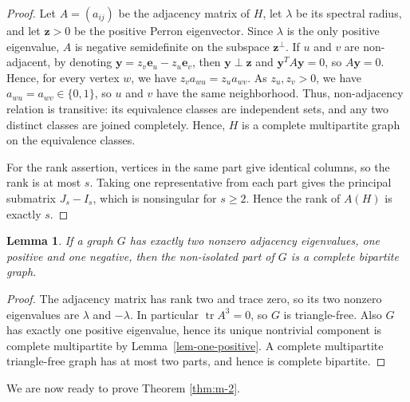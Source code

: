 \documentclass[11pt,a4paper]{article}
\newtheorem{lemma}[theorem]{Lemma}
\theoremstyle{definition}
\theoremstyle{plain}
\renewcommand{\ge}{\geqslant}
\begin{document}
\begin{proof}
Let $A=(a_{ij})$ be the adjacency matrix of $H$, let $\lambda$ be its spectral radius, and let $\bm{z}>0$ be the positive Perron eigenvector. Since $\lambda$ is the only positive eigenvalue, 
$A$ is negative semidefinite on the subspace $\bm{z}^\perp$. 
If $u$ and $v$ are non-adjacent, by denoting $\bm{y}=z_v \bm{e}_u-z_u \bm{e}_v$,  
then $\bm{y} \perp \bm{z}$ and $\bm{y}^T A \bm{y}=0$, so $A\bm{y}=0$. Hence, for every vertex $w$, we have $z_v a_{wu}=z_u a_{wv}$. 
As \(z_u,z_v>0\), we have $a_{wu}=a_{wv}\in\{0,1\}$, so 
 $u$ and $v$ have the same neighborhood. 
Thus, non-adjacency relation is transitive: 
its equivalence classes are independent sets, and any two distinct classes are joined completely. Hence, \(H\) is a
complete multipartite graph on the equivalence classes.

For the rank assertion, vertices in the same part give identical columns, so the rank is at
most $s$. Taking one representative from each part gives the principal submatrix $J_s -I_s$, which is nonsingular for $s\ge 2$. Hence the rank of $A(H)$ is exactly $s$.
\end{proof} 

\begin{lemma}\label{lem:rank-two-bipartite}
If a graph \(G\) has exactly two nonzero adjacency eigenvalues, one positive
and one negative, then the non-isolated part of \(G\) is a complete bipartite
graph.
\end{lemma}

\begin{proof}
The adjacency matrix has rank two and trace zero, so its two nonzero eigenvalues
are \(\lambda\) and \(-\lambda\). In particular \(\operatorname{tr}A^3=0\), so
\(G\) is triangle-free. Also \(G\) has exactly one positive eigenvalue, hence
its unique nontrivial component is complete multipartite by
Lemma~\ref{lem-one-positive}. A complete multipartite triangle-free graph has
at most two parts, and hence is complete bipartite.
\end{proof}


We are now ready to prove Theorem \ref{thm:m-2}. 
\end{document}
